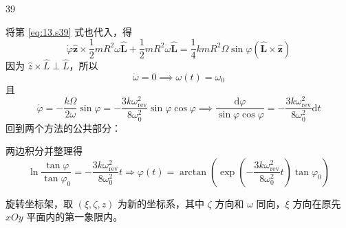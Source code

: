 \begin{solution}{39}
\begin{subsolution}
\begin{subsubsolution}
            将第 \eqref{eq:13.s39} 式也代入，得
            \begin{equation}
                \dot {\varphi} \hat {\pmb {z}} \times \frac {1}{2} m R ^ {2} \omega \hat {\pmb {L}} + \frac {1}{2} m R ^ {2} \dot {\omega} \hat {\pmb {L}} = \frac {1}{4} k m R ^ {2} \varOmega \sin \varphi (\hat {\pmb {L}} \times \hat {\pmb {z}})
                \label{eq:21'.s39}
            \end{equation}
            因为 $\hat{z} \times \hat{L} \perp \hat{L}$，所以
            \begin{equation}
                \dot {\omega} = 0 \implies \omega (t) = \omega_ {0}
                \label{eq:22'.s39}
            \end{equation}
            且
            \begin{equation}
                \dot {\varphi} = - \frac {k \Omega}{2 \omega} \sin \varphi = - \frac {3 k \omega_ {\mathrm{rev}} ^ {2}}{8 \omega_ {0} ^ {2}} \sin \varphi \cos \varphi \implies \frac {\mathrm{d} \varphi}{\sin \varphi \cos \varphi} = - \frac {3 k \omega_ {\mathrm{rev}} ^ {2}}{8 \omega_ {0} ^ {2}} \mathrm{d} t
                \label{eq:23'.s39}
            \end{equation}
            回到两个方法的公共部分：

            两边积分并整理得
            \begin{equation}
                \ln {\frac {\tan \varphi}{\tan \varphi_ {0}}} = - \frac {3 k \omega_ {\mathrm{rev}} ^ {2}}{8 \omega_ {0} ^ {2}} t \Rightarrow \varphi (t) = \arctan \left(\exp \left(- \frac {3 k \omega_ {\mathrm{rev}} ^ {2}}{8 \omega_ {0} ^ {2}} t\right) \tan \varphi_ {0}\right)
                \label{eq:25.s39}
            \end{equation}
        \end{subsubsolution}
        \begin{subsubsolution}
            旋转坐标架，取 $(\xi, \zeta, z)$ 为新的坐标系，其中 $\zeta$ 方向和 $\omega$ 同向，$\xi$ 方向在原先 $xOy$ 平面内的第一象限内。


\end{subsubsolution}
\end{subsolution}
\end{solution}
